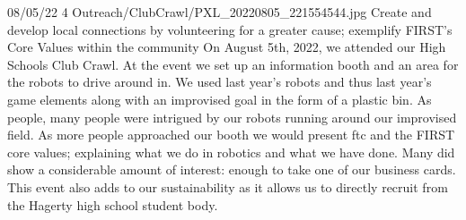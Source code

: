 {08/05/22}
{4}
{Outreach/ClubCrawl/PXL_20220805_221554544.jpg}
{Create and develop local connections by volunteering for a greater cause; exemplify FIRST's Core Values within the community} 
{On August 5th, 2022, we attended our High Schools Club Crawl. At the event we set up an information booth and an area for the robots to drive around in. We used last year’s robots and thus last year’s game elements along with an improvised goal in the form of a plastic bin. As people, many people were intrigued by our robots running around our improvised field. As more people approached our booth we would present ftc and the FIRST core values; explaining what we do in robotics and what we have done. Many did show a considerable amount of interest: enough to take one of our business cards. This event also adds to our sustainability as it allows us to directly recruit from the Hagerty high school student body. 
} 

